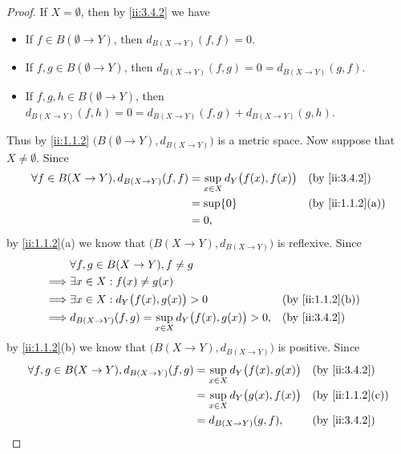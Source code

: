 \begin{proof}
  If \(X = \emptyset\), then by \cref{ii:3.4.2} we have
  \begin{itemize}
    \item If \(f \in B(\emptyset \to Y)\), then \(d_{B(X \to Y)}(f, f) = 0\).
    \item If \(f, g \in B(\emptyset \to Y)\), then \(d_{B(X \to Y)}(f, g) = 0 = d_{B(X \to Y)}(g, f)\).
    \item If \(f, g, h \in B(\emptyset \to Y)\), then \(d_{B(X \to Y)}(f, h) = 0 = d_{B(X \to Y)}(f, g) + d_{B(X \to Y)}(g, h)\).
  \end{itemize}
  Thus by \cref{ii:1.1.2} \(\big(B(\emptyset \to Y), d_{B(X \to Y)}\big)\) is a metric space.
  Now suppose that \(X \neq \emptyset\).
  Since
  \begin{align*}
    \forall f \in B(X \to Y), d_{B(X \to Y)}(f, f) & = \sup_{x \in X} d_Y\big(f(x), f(x)\big) &  & \by{ii:3.4.2}    \\
                                                   & = \sup \set{0}                           &  & \by{ii:1.1.2}[a] \\
                                                   & = 0,
  \end{align*}
  by \cref{ii:1.1.2}(a) we know that \(\big(B(X \to Y), d_{B(X \to Y)}\big)\) is reflexive.
  Since
  \begin{align*}
             & \forall f, g \in B(X \to Y), f \neq g                                                 \\
    \implies & \exists x \in X : f(x) \neq g(x)                                                      \\
    \implies & \exists x \in X : d_Y\big(f(x), g(x)\big) > 0                      &  & \by{ii:1.1.2}[b] \\
    \implies & d_{B(X \to Y)}(f, g) = \sup_{x \in X} d_Y\big(f(x), g(x)\big) > 0, &  & \by{ii:3.4.2}
  \end{align*}
  by \cref{ii:1.1.2}(b) we know that \(\big(B(X \to Y), d_{B(X \to Y)}\big)\) is positive.
  Since
  \begin{align*}
    \forall f, g \in B(X \to Y), d_{B(X \to Y)}(f, g) & = \sup_{x \in X} d_Y\big(f(x), g(x)\big) &  & \by{ii:3.4.2}    \\
                                                      & = \sup_{x \in X} d_Y\big(g(x), f(x)\big) &  & \by{ii:1.1.2}[c] \\
                                                      & = d_{B(X \to Y)}(g, f),                  &  & \by{ii:3.4.2}

\end{align*}
\end{proof}
